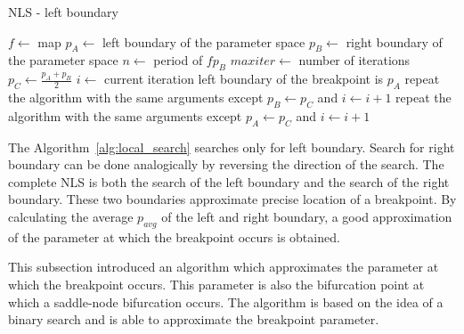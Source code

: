 \begin{algorithm}[!h]
    \caption{NLS - left boundary}
    \label{alg:local_search}
    \begin{algorithmic}[1]
        \Statex $f \gets$ map
        \Statex $p_{A} \gets$ left boundary of the parameter space
        \Statex $p_{B} \gets$ right boundary of the parameter space
        \Statex $n \gets$ period of $f{p_{B}}$
        \Statex $maxiter \gets$ number of iterations
        \State $p_{C} \gets \frac{p_{A}+p_{B}}{2}$
        \State $i \gets$ current iteration
            \State left boundary of the breakpoint is $p_{A}$
        \EndIf
            \State repeat the algorithm with the same arguments except $p_{B} \gets p_{C}$ and $i \gets i+1$
        \Else
            \State repeat the algorithm with the same arguments except $p_{A} \gets p_{C}$ and $i \gets i+1$
        \EndIf
    \end{algorithmic}
\end{algorithm}

\par
The Algorithm~\ref{alg:local_search} searches only for left boundary. Search for right boundary can be done analogically by reversing the direction of the search.
The complete NLS is both the search of the left boundary and the search of the right boundary.
These two boundaries approximate precise location of a breakpoint.
By calculating the average $p_{avg}$ of the left and right boundary, a good approximation of the parameter at which the breakpoint occurs is obtained.
\par
This subsection introduced an algorithm which approximates the parameter at which the breakpoint occurs.
This parameter is also the bifurcation point at which a saddle-node bifurcation occurs.
The algorithm is based on the idea of a binary search and is able to approximate the breakpoint parameter.

